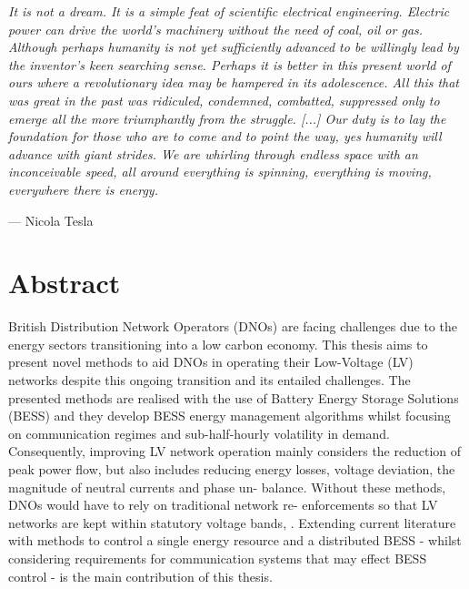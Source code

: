 
\epigraph{\textit{It is not a dream. It is a simple feat of scientific electrical engineering. Electric power can drive the world's machinery without the need of coal, oil or gas. Although perhaps humanity is not yet sufficiently advanced to be willingly lead by the inventor's keen searching sense. Perhaps it is better in this present world of ours where a revolutionary idea may be hampered in its adolescence. All this that was great in the past was ridiculed, condemned, combatted, suppressed only to emerge all the more triumphantly from the struggle. [...] Our duty is to lay the foundation for those who are to come and to point the way, yes humanity will advance with giant strides. We are whirling through endless space with an inconceivable speed, all around everything is spinning, everything is moving, everywhere there is energy.}}{--- Nicola Tesla}


\chapter*{Abstract}




British Distribution Network Operators (DNOs) are facing challenges due to the\linebreak
energy sectors transitioning into a low carbon economy. This thesis aims to present\linebreak
novel methods to aid DNOs in operating their Low-Voltage (LV) networks despite this\linebreak
ongoing transition and its entailed challenges. The presented methods are realised\linebreak
with the use of Battery Energy Storage Solutions (BESS) and they develop BESS\linebreak
energy management algorithms whilst focusing on communication regimes and\linebreak
sub-half-hourly volatility in demand. Consequently, improving LV network operation\linebreak
mainly considers the reduction of peak power flow, but also includes reducing\linebreak
energy losses, voltage deviation, the magnitude of neutral currents and phase un-\linebreak
balance. Without these methods, DNOs would have to rely on traditional network re-\linebreak
enforcements so that LV networks are kept within statutory voltage bands, . Extending current literature with methods to control a single energy\linebreak
resource and a distributed BESS - whilst considering requirements for communication\linebreak
systems that may effect BESS control - is the main contribution of this thesis.

